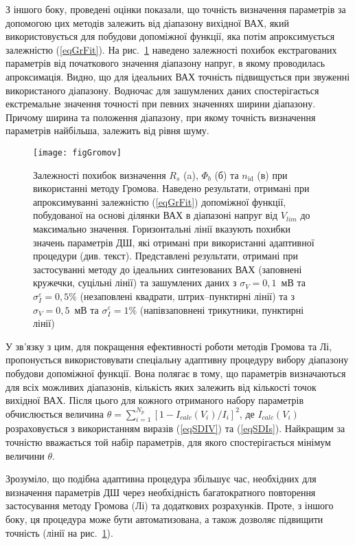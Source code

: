 З іншого боку, проведені оцінки показали, що точність визначення параметрів за допомогою цих методів залежить від діапазону вихідної ВАХ, який використовується для побудови допоміжної функції, яка потім апроксимується залежністю (\ref{eqGrFit}).
На рис.~\ref{figGromov} наведено залежності похибок екстрагованих параметрів від початкового значення діапазону напруг, в якому проводилась апроксимація.
Видно, що для ідеальних ВАХ точність підвищується при звуженні використаного діапазону.
Водночас для зашумлених даних спостерігається екстремальне значення точності  при певних значеннях ширини діапазону.
Причому ширина та положення діапазону, при якому точність визначення параметрів найбільша, залежить від рівня шуму.



\begin{figure}
\center
\texttt{[image: figGromov]}%
\caption{\label{figGromov}
Залежності похибок визначення $R_s$ (a), $\Phi_b$ (б) та $n_\mathrm{id}$ (в) при використанні методу Громова.
Наведено результати, отримані при апроксимуванні залежністю (\ref{eqGrFit}) допоміжної функції, побудованої
на основі ділянки ВАХ в діапазоні напруг від $V_{lim}$ до максимально значення.
Горизонтальні лінії вказують похибки значень параметрів ДШ, які отримані при використанні адаптивної процедури (див. текст).
Представлені результати, отримані при застосуванні методу до ідеальних синтезованих ВАХ (заповнені кружечки, суцільні лінії) та зашумлених даних
з $\sigma_V=0,1$~мВ та $\sigma_I^\varepsilon=0,5\%$ (незаповлені квадрати, штрих--пунктирні лінії) та з $\sigma_V=0,5$~мВ та $\sigma_I^\varepsilon=1\%$
(напівзаповнені трикутники, пунктирні лінії)
}
\end{figure}

У зв'язку з цим, для покращення ефективності роботи методів Громова та Лі, пропонується використовувати спеціальну адаптивну процедуру вибору діапазону побудови допоміжної функції.
Вона полягає в тому, що параметрів визначаються для всіх можливих діапазонів, кількість яких залежить від кількості точок вихідної ВАХ.
Після цього для кожного отриманого набору параметрів обчислюється величина $\theta=\sum_{i=1}^{N_p}[1-I_{calc}(V_i)/I_i]^2$,
де $I_{calc}(V_i)$ розраховується з використанням виразів (\ref{eqSDIV}) та (\ref{eqSDIs}).
Найкращим за точністю вважається той набір параметрів, для якого спостерігається мінімум величини $\theta$.

Зрозуміло, що подібна адаптивна процедура збільшує час, необхідних для визначення параметрів ДШ через необхідність багатократного повторення застосування методу Громова (Лі) та додаткових розрахунків.
Проте, з іншого боку, ця процедура може бути автоматизована, а також дозволяє підвищити точність (лінії на рис.~\ref{figGromov}).

